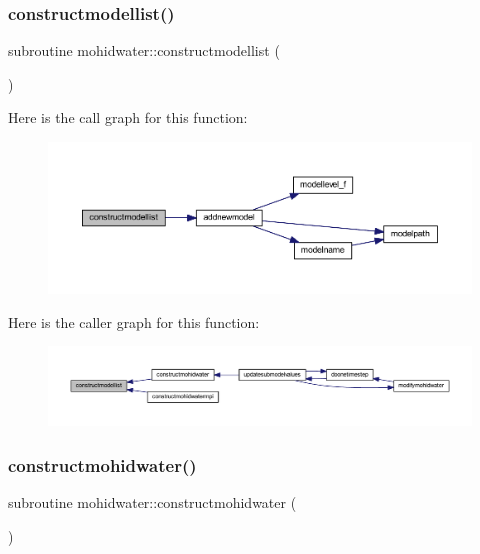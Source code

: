 \subsubsection{\texorpdfstring{constructmodellist()}{constructmodellist()}}
{\footnotesize\ttfamily subroutine mohidwater\+::constructmodellist (\begin{DoxyParamCaption}{ }\end{DoxyParamCaption})}

Here is the call graph for this function\+:\nopagebreak
\begin{figure}[H]
\begin{center}
\leavevmode
\includegraphics[width=350pt]{_main_8_f90_a02fa61b3a3e945d0354664955c2666fb_cgraph}
\end{center}
\end{figure}
Here is the caller graph for this function\+:\nopagebreak
\begin{figure}[H]
\begin{center}
\leavevmode
\includegraphics[width=350pt]{_main_8_f90_a02fa61b3a3e945d0354664955c2666fb_icgraph}
\end{center}
\end{figure}
\mbox{\label{_main_8_f90_abc6cfc7bca3f0c4dda032a34b9690319}} 
\subsubsection{\texorpdfstring{constructmohidwater()}{constructmohidwater()}}
{\footnotesize\ttfamily subroutine mohidwater\+::constructmohidwater (\begin{DoxyParamCaption}{ }\end{DoxyParamCaption})}

